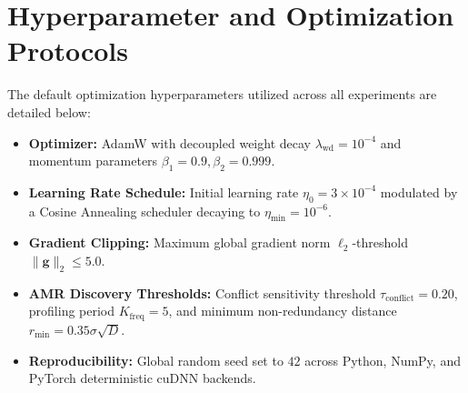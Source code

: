 \documentclass[10pt,journal,compsoc]{IEEEtran}
\begin{document}
\section{Hyperparameter and Optimization Protocols}
\label{sec:appendix_hyperparams}
The default optimization hyperparameters utilized across all experiments are detailed below:
\begin{itemize}
    \item \textbf{Optimizer:} AdamW with decoupled weight decay $\lambda_{\text{wd}} = 10^{-4}$ and momentum parameters $\beta_1 = 0.9, \beta_2 = 0.999$.
    \item \textbf{Learning Rate Schedule:} Initial learning rate $\eta_0 = 3 \times 10^{-4}$ modulated by a Cosine Annealing scheduler decaying to $\eta_{\min} = 10^{-6}$.
    \item \textbf{Gradient Clipping:} Maximum global gradient norm $\ell_2$-threshold $\|\mathbf{g}\|_2 \le 5.0$.
    \item \textbf{AMR Discovery Thresholds:} Conflict sensitivity threshold $\tau_{\text{conflict}} = 0.20$, profiling period $K_{\text{freq}} = 5$, and minimum non-redundancy distance $r_{\min} = 0.35 \sigma \sqrt{D}$.
    \item \textbf{Reproducibility:} Global random seed set to $42$ across Python, NumPy, and PyTorch deterministic cuDNN backends.
\end{itemize}
\end{document}
